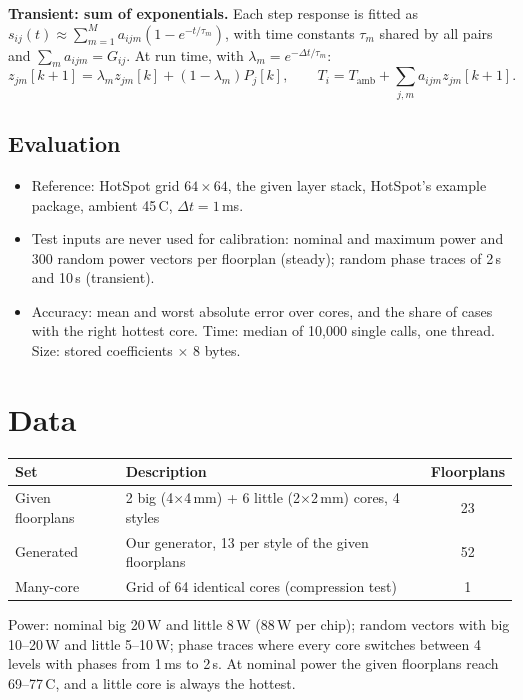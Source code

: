 \documentclass[11pt,a4paper]{article}
\newcommand{\degC}{\,\textdegree C}
\begin{document}
\textbf{Transient: sum of exponentials.} Each step response is fitted as
$s_{ij}(t) \approx \sum_{m=1}^{M} a_{ijm}(1-e^{-t/\tau_m})$, with time constants $\tau_m$ shared
by all pairs and $\sum_m a_{ijm} = G_{ij}$. At run time, with $\lambda_m = e^{-\Delta t/\tau_m}$:
\begin{equation}
  z_{jm}[k+1] = \lambda_m z_{jm}[k] + (1-\lambda_m) P_j[k],
  \qquad T_i = T_\text{amb} + \sum_{j,m} a_{ijm} z_{jm}[k+1].
\end{equation}

\subsection{Evaluation}
\begin{itemize}
  \item Reference: HotSpot grid $64\times64$, the given layer stack, HotSpot's example package,
        ambient 45\degC, $\Delta t = 1$\,ms.
  \item Test inputs are never used for calibration: nominal and maximum power and 300 random power
        vectors per floorplan (steady); random phase traces of 2\,s and 10\,s (transient).
  \item Accuracy: mean and worst absolute error over cores, and the share of cases with the right
        hottest core. Time: median of 10{,}000 single calls, one thread. Size: stored coefficients
        $\times$ 8 bytes.
\end{itemize}

\section{Data}
\begin{center}
\small
\begin{tabular}{@{}l p{8.5cm} c@{}}
\toprule
Set & Description & Floorplans \\
\midrule
Given floorplans & 2 big (4$\times$4\,mm) + 6 little (2$\times$2\,mm) cores, 4 styles & 23 \\
Generated & Our generator, 13 per style of the given floorplans & 52 \\
Many-core & Grid of 64 identical cores (compression test) & 1 \\
\bottomrule
\end{tabular}
\end{center}
Power: nominal big 20\,W and little 8\,W (88\,W per chip); random vectors with big 10--20\,W and
little 5--10\,W; phase traces where every core switches between 4 levels with phases from 1\,ms to
2\,s. At nominal power the given floorplans reach 69--77\degC, and a little core is always the
hottest.
\end{document}
